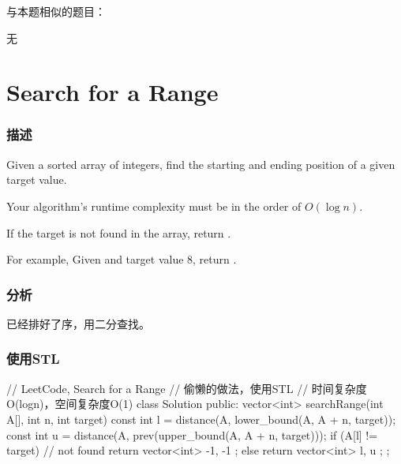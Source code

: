 与本题相似的题目：
\begindot
\item  无
\myenddot


\section{Search for a Range} %
\label{sec:search-for-a-range}


\subsubsection{描述}
Given a sorted array of integers, find the starting and ending position of a given target value.

Your algorithm's runtime complexity must be in the order of $O(\log n)$.

If the target is not found in the array, return \code{[-1, -1]}.

For example,
Given \code{[5, 7, 7, 8, 8, 10]} and target value 8,
return \code{[3, 4]}.


\subsubsection{分析}
已经排好了序，用二分查找。


\subsubsection{使用STL}
\begin{Code}
	// LeetCode, Search for a Range
	// 偷懒的做法，使用STL
	// 时间复杂度O(logn)，空间复杂度O(1)
	class Solution {
		public:
		vector<int> searchRange(int A[], int n, int target) {
			const int l = distance(A, lower_bound(A, A + n, target));
			const int u = distance(A, prev(upper_bound(A, A + n, target)));
			if (A[l] != target) // not found
			return vector<int> { -1, -1 };
			else
			return vector<int> { l, u };
		}
	};
\end{Code}


